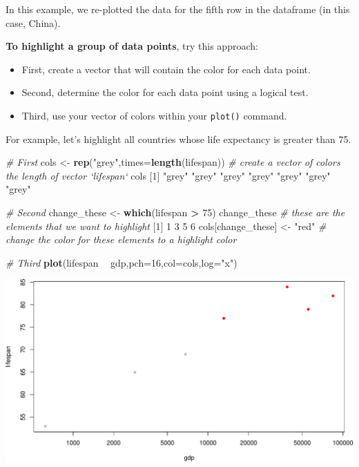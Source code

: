 \documentclass[
]{book}
\newenvironment{Shaded}{\begin{snugshade}}{\end{snugshade}}
\newcommand{\CommentTok}[1]{\textcolor[rgb]{0.56,0.35,0.01}{\textit{#1}}}
\newcommand{\DataTypeTok}[1]{\textcolor[rgb]{0.13,0.29,0.53}{#1}}
\newcommand{\DecValTok}[1]{\textcolor[rgb]{0.00,0.00,0.81}{#1}}
\newcommand{\KeywordTok}[1]{\textcolor[rgb]{0.13,0.29,0.53}{\textbf{#1}}}
\newcommand{\NormalTok}[1]{#1}
\newcommand{\OperatorTok}[1]{\textcolor[rgb]{0.81,0.36,0.00}{\textbf{#1}}}
\newcommand{\StringTok}[1]{\textcolor[rgb]{0.31,0.60,0.02}{#1}}
\begin{document}
In this example, we re-plotted the data for the fifth row in the dataframe (in this case, China).

\textbf{To highlight a group of data points}, try this approach:

\begin{itemize}
\item
  First, create a vector that will contain the color for each data point.
\item
  Second, determine the color for each data point using a logical test.
\item
  Third, use your vector of colors within your \texttt{plot()} command.
\end{itemize}

For example, let's highlight all countries whose life expectancy is greater than 75.

\begin{Shaded}
\begin{Highlighting}[]
\CommentTok{# First}
\NormalTok{cols <-}\StringTok{ }\KeywordTok{rep}\NormalTok{(}\StringTok{"grey"}\NormalTok{,}\DataTypeTok{times=}\KeywordTok{length}\NormalTok{(lifespan)) }\CommentTok{# create a vector of colors the length of vector `lifespan`}
\NormalTok{cols}
\NormalTok{[}\DecValTok{1}\NormalTok{] }\StringTok{"grey"} \StringTok{"grey"} \StringTok{"grey"} \StringTok{"grey"} \StringTok{"grey"} \StringTok{"grey"} \StringTok{"grey"}

\CommentTok{# Second}
\NormalTok{change_these <-}\StringTok{ }\KeywordTok{which}\NormalTok{(lifespan }\OperatorTok{>}\StringTok{ }\DecValTok{75}\NormalTok{) }
\NormalTok{change_these }\CommentTok{# these are the elements that we want to highlight}
\NormalTok{[}\DecValTok{1}\NormalTok{] }\DecValTok{1} \DecValTok{3} \DecValTok{5} \DecValTok{6}
\NormalTok{cols[change_these] <-}\StringTok{ "red"}  \CommentTok{# change the color for these elements to a highlight color}

\CommentTok{# Third}
\KeywordTok{plot}\NormalTok{(lifespan }\OperatorTok{~}\StringTok{ }\NormalTok{gdp,}\DataTypeTok{pch=}\DecValTok{16}\NormalTok{,}\DataTypeTok{col=}\NormalTok{cols,}\DataTypeTok{log=}\StringTok{"x"}\NormalTok{)}
\end{Highlighting}
\end{Shaded}

\includegraphics{figures/unnamed-chunk-121-1.pdf}
\end{document}
